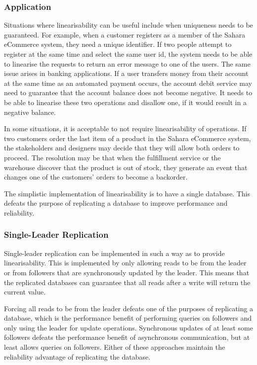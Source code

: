 \subsubsection{Application}

Situations where linearisability can be useful include when uniqueness needs to be guaranteed.
For example, when a customer registers as a member of the Sahara eCommerce system,
they need a unique identifier.
If two people attempt to register at the same time and select the same user id,
the system needs to be able to linearise the requests to return an error message to one of the users.
The same issue arises in banking applications.
If a user transfers money from their account at the same time as an automated payment occurs,
the account debit service may need to guarantee that the account balance does not become negative.
It needs to be able to linearise these two operations and disallow one, if it would result in a negative balance.

In some situations, it is acceptable to not require linearisability of operations.
If two customers order the last item of a product in the Sahara eCommerce system,
the stakeholders and designers may decide that they will allow both orders to proceed.
The resolution may be that when the fulfillment service or the warehouse discover that
the product is out of stock, they generate an event that changes one of the customers' orders to become a backorder.

The simplistic implementation of linearisability is to have a single database.
This defeats the purpose of replicating a database to improve performance and reliability.

\subsubsection{Single-Leader Replication}\label{sec:slr}
Single-leader replication can be implemented in such a way as to provide linearisability.
This is implemented by only allowing reads to be from the leader or from followers that are synchronously updated by the leader.
This means that the replicated databases can guarantee that all reads after a write will return the current value.

Forcing all reads to be from the leader defeats one of the purposes of replicating a database,
which is the performance benefit of performing queries on followers and only using the leader for update operations.
Synchronous updates of at least some followers defeats the performance benefit of asynchronous communication,
but at least allows queries on followers.
Either of these approaches maintain the reliability advantage of replicating the database.

